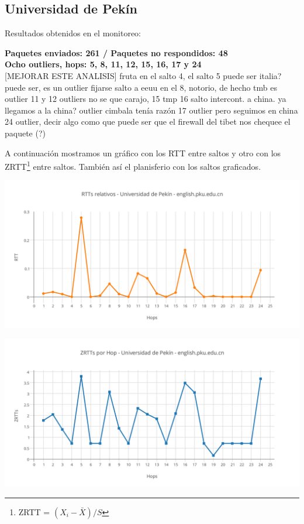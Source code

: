 \subsection{Universidad de Pekín}

Resultados obtenidos en el monitoreo:\\

\smallskip

\bigskip

\textbf{Paquetes enviados: 261 / Paquetes no respondidos: 48}\\

\textbf{Ocho outliers, hops: 5, 8, 11, 12, 15, 16, 17 y 24}\\

[MEJORAR ESTE ANALISIS]
fruta en el salto 4, el salto 5 puede ser italia? puede ser, es un outlier fijarse
salto a eeuu en el 8, notorio, de hecho tmb es outlier
11 y 12 outliers no se que carajo, 15 tmp
16 salto intercont. a china. ya llegamos a la china? outlier cimbala tenía razón
17 outlier pero seguimos en china
24 outlier, decir algo como que puede ser que el firewall del tibet nos chequee el paquete (?)

A continuación mostramos un gráfico con los RTT entre saltos y otro con los ZRTT\footnote{ZRTT = $(X_i - \bar{X}) / S$}  entre saltos. También así el planisferio con los saltos graficados.

\includegraphics[scale=0.65]{imagenes/pekin/RTTs.png} 

\includegraphics[scale=0.65]{imagenes/pekin/ZRTTs.png} 

